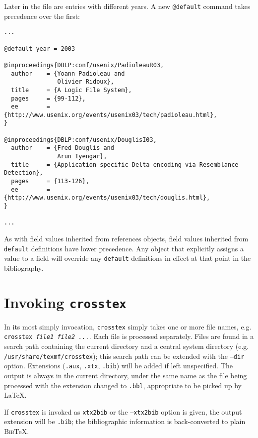 \documentclass{article}
\newcommand{\BibTeX}{\textsc{Bib}\TeX}
\begin{document}
Later in the file are entries with different years. A new \texttt{@default} command takes precedence over the first:

\begin{small}\begin{verbatim}
...

@default year = 2003

@inproceedings{DBLP:conf/usenix/PadioleauR03,
  author    = {Yoann Padioleau and
               Olivier Ridoux},
  title     = {A Logic File System},
  pages     = {99-112},
  ee        = {http://www.usenix.org/events/usenix03/tech/padioleau.html},
}

@inproceedings{DBLP:conf/usenix/DouglisI03,
  author    = {Fred Douglis and
               Arun Iyengar},
  title     = {Application-specific Delta-encoding via Resemblance Detection},
  pages     = {113-126},
  ee        = {http://www.usenix.org/events/usenix03/tech/douglis.html},
}

...
\end{verbatim}\end{small}

As with field values inherited from references objects, field values
inherited from \texttt{default} definitions have lower precedence. Any
object that explicitly assigns a value to a field will override any 
\texttt{default} definitions in effect at that point in the bibliography.



\section{Invoking \texttt{crosstex}}

In its most simply invocation, \texttt{crosstex} simply takes one or more file names, e.g. \texttt{crosstex \textrm{\textit{file1 file2 ...}}}. Each file is processed separately. Files are found in a search path containing the current directory and a central system directory (e.g. \texttt{/usr/share/texmf/crosstex}); this search path can be extended with the \texttt{--dir} option. Extensions (\texttt{.aux}, \texttt{.xtx}, \texttt{.bib}) will be added if left unspecified. The output is always in the current directory, under the same name as the file being processed with the extension changed to \texttt{.bbl}, appropriate to be picked up by \LaTeX{}.

If \texttt{crosstex} is invoked as \texttt{xtx2bib} or the \texttt{--xtx2bib} option is given, the output extension will be \texttt{.bib}; the bibliographic information is back-converted to plain \BibTeX{}.
\end{document}
